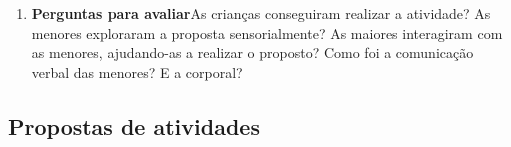 \documentclass[11pt]{extarticle}
\begin{document}
\begin{enumerate}
\item \textbf{Perguntas para avaliar}\quad As crianças conseguiram realizar a atividade? As menores exploraram a proposta sensorialmente? As maiores interagiram com as menores, ajudando-as a realizar o proposto? Como foi a comunicação verbal das menores? E a corporal? 
\end{enumerate}




\subsection{Propostas de atividades}

\end{document}
